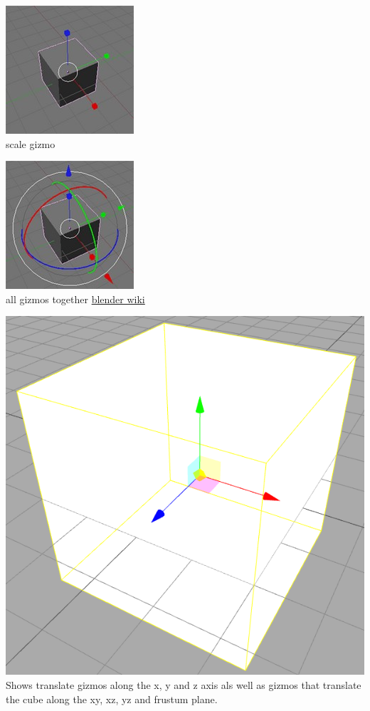 \includegraphics{../assets/Manual-Manipulators-Scale.jpg}\\
 scale gizmo

\includegraphics{../assets/Manual-Manipulators-Combo.jpg}\\
 all gizmos together
\href{http://wiki.blender.org/index.php/Doc:2.4/Manual/3D_interaction/Transform_Control/Manipulators}{blender
wiki}

\includegraphics{../assets/threejs-editor.png}\\
 Shows translate gizmos along the x, y and z axis als well as gizmos
that translate the cube along the xy, xz, yz and frustum plane.

